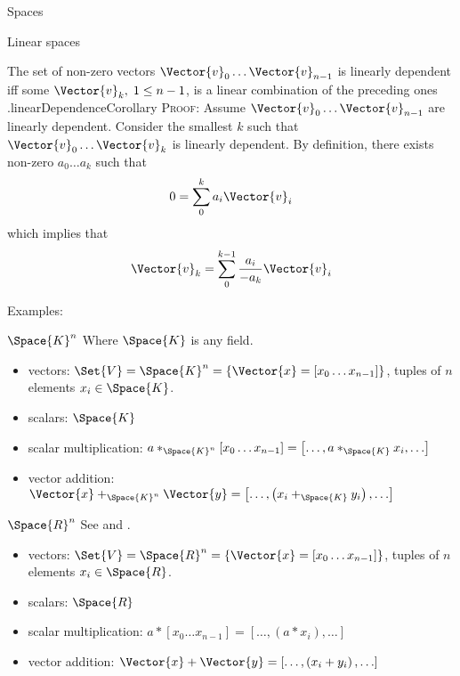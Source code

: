 \begin{plSection}{Spaces}
\begin{plSection}{Linear spaces}
\begin{plCorollary}{The set of non-zero vectors
 $\Vector{v}_0 \ldots \Vector{v}_{n-1}$
is linearly dependent iff some $\Vector{v}_k, \; 1 \leq n-1$, 
is a linear combination of the preceding 
ones .}{linearDependenceCorollary}
\textsc{Proof:}
Assume  $\Vector{v}_0 \ldots \Vector{v}_{n-1}$ are linearly dependent.
Consider the smallest $k$ such that 
$\Vector{v}_0 \ldots \Vector{v}_{k}$ is linearly dependent.
By definition,
there exists non-zero $a_0 \ldots a_{k}$ such that
\begin{equation}
0 = \sum_0^k a_i \Vector{v}_i
\end{equation}
which implies that
\begin{equation}
\Vector{v}_k = \sum_0^{k-1} \frac{a_i}{- a_k} \Vector{v}_i
\end{equation}
\end{plCorollary}

Examples:

\begin{plExample}{$\Space{K}^n$}{}
Where $\Space{K}$ is any field.
\begin{itemize}
  \item vectors:
  $\Set{V} = \Space{K}^n = \left\{ \Vector{x}
  = \left[ x_0 \ldots  x_{n-1} \right] \right\}$,
  tuples of $n$ elements $x_i \in \Space{K}$.
  \item scalars: $\Space{K}$
  \item scalar multiplication:
  $ a *_{\Space{K}^n} \left[ x_0 \ldots  x_{n-1} \right] =
  \left[ \ldots , a *_{\Space{K}} x_{i} , \ldots \right]$
  \item vector addition:
  $\Vector{x} +_{\Space{K}^n} \Vector{y}
  = \left[ \ldots , \left( x_i +_{\Space{K}} y_i \right) ,\ldots \right]$
\end{itemize}
\end{plExample}

\begin{plExample}{$\Space{R}^n$}{}
\vspace{\topsep}
\setlength{\parskip}{5pt}
\setlength{\parindent}{0pt}
See 
and .
\begin{itemize}
  \item vectors:
  $\Set{V} = \Space{R}^n = \left\{ \Vector{x}
  = \left[ x_0 \ldots  x_{n-1} \right] \right\}$,
  tuples of $n$ elements $x_i \in \Space{R}$.
  \item scalars: $\Space{R}$
  \item scalar multiplication:
  $ a*\left[ x_0 \ldots  x_{n-1} \right] =
  \left[ \ldots , \left( a*x_i \right) , \ldots \right]$
  \item vector addition:
  $\Vector{x} + \Vector{y}
  = \left[ \ldots , \left( x_i + y_i \right) , \ldots \right]$
\end{itemize}


\end{plExample}
\end{plSection}
\end{plSection}
